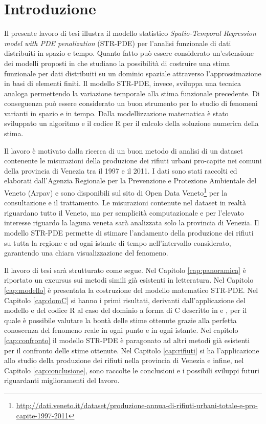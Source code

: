 \documentclass[a4paper,11pt,twoside,openright]{book}							%
\begin{document}
\chapter*{Introduzione}
\label{Cap:intro}

Il presente lavoro di tesi illustra il modello statistico \textit{Spatio-Temporal Regression model with PDE penalization} (STR-PDE) per l'analisi funzionale di dati distribuiti in spazio e tempo. Quanto fatto può essere considerato un'estensione dei modelli proposti in \cite{art:sangalli} che studiano la possibilità di costruire una stima funzionale per dati distribuiti su un dominio spaziale attraverso l'approssimazione in basi di elementi finiti. Il modello STR-PDE, invece, sviluppa una tecnica analoga permettendo la variazione temporale alla stima funzionale precedente. Di conseguenza può essere considerato un buon strumento per lo studio di fenomeni varianti in spazio e in tempo. Dalla modellizzazione matematica è stato sviluppato un algoritmo e il codice R per il calcolo della soluzione numerica della stima.

Il lavoro è motivato dalla ricerca di un buon metodo di analisi di un dataset contenente le misurazioni della produzione dei rifiuti urbani pro-capite nei comuni della provincia di Venezia tra il 1997 e il 2011. I dati sono stati raccolti ed elaborati dall'Agenzia Regionale per la Prevenzione e Protezione Ambientale del Veneto (Arpav) e sono disponibili sul sito di Open Data Veneto\footnote{\href{http://dati.veneto.it/dataset/produzione-annua-di-rifiuti-urbani-totale-e-pro-capite-1997-2011}{http://dati.veneto.it/dataset/produzione-annua-di-rifiuti-urbani-totale-e-pro-capite-1997-2011}} per la consultazione e il trattamento. Le misurazioni contenute nel dataset in realtà riguardano tutto il Veneto, ma per semplicità computazionale e per l'elevato interesse riguardo la laguna veneta sarà analizzata solo la provincia di Venezia. Il modello STR-PDE permette di stimare l'andamento della produzione dei rifiuti su tutta la regione e ad ogni istante di tempo nell'intervallo considerato, garantendo una chiara visualizzazione del fenomeno.

Il lavoro di tesi sarà strutturato come segue. Nel Capitolo \ref{cap:panoramica} è riportato un excursus sui metodi simili già esistenti in letteratura. Nel Capitolo \ref{cap:modello} è presentata la costruzione del modello matematico STR-PDE. Nel Capitolo \ref{cap:domC} si hanno i primi risultati, derivanti dall'applicazione del modello e del codice R al caso del dominio a forma di C descritto in \cite{art:ramsay} e \cite{art:wood}, per il quale è possibile valutare la bontà delle stime ottenute grazie alla perfetta conoscenza del fenomeno reale in ogni punto e in ogni istante. Nel capitolo \ref{cap:confronto} il modello STR-PDE è paragonato ad altri metodi già esistenti per il confronto delle stime ottenute. Nel Capitolo \ref{cap:rifiuti} si ha l'applicazione allo studio della produzione dei rifiuti nella provincia di Venezia e infine, nel Capitolo \ref{cap:conclusione}, sono raccolte le conclusioni e i possibili sviluppi futuri riguardanti miglioramenti del lavoro.
\end{document}
